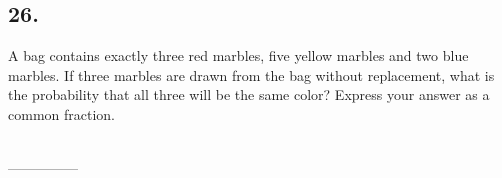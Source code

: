 \documentclass[12pt]{article}
\begin{document}
\begin{answer}
%
\end{answer}


\subsection*{26.}
A bag contains exactly three red marbles, five yellow marbles and two blue marbles. If three marbles are drawn from the bag without replacement, what is the probability that all three will be the same color? Express your answer as a common fraction.

\nopagebreak

\begin{minipage}[b]{\linewidth}
\fbox{\phantom{ANSWER}}\\
\mbox{---------------}\\
\fbox{\phantom{ANSWER}}
\end{minipage}
\end{document}
